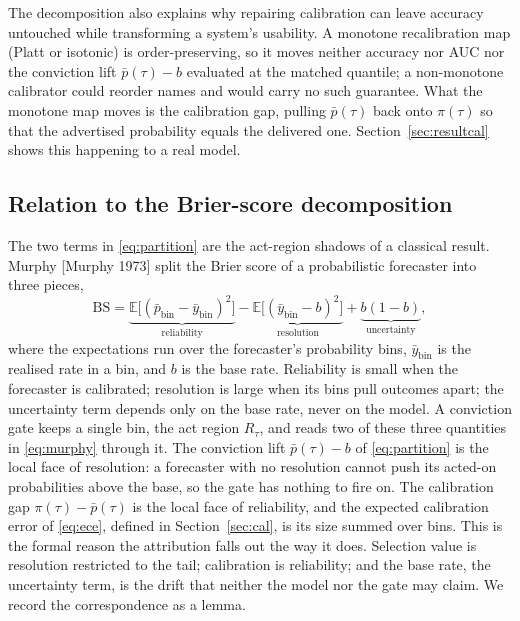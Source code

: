 \documentclass[10pt, a4paper, oneside]{article}
\theoremstyle{definition}
\theoremstyle{plain}
\begin{document}
The decomposition also explains why repairing calibration can leave accuracy
untouched while transforming a system's usability. A monotone recalibration map (Platt
or isotonic) is order-preserving, so it moves neither accuracy nor AUC nor the
conviction lift $\bar p(\tau)-b$ evaluated at the matched quantile; a non-monotone
calibrator could reorder names and would carry no such guarantee. What the monotone
map moves is the calibration gap, pulling $\bar p(\tau)$ back onto $\pi(\tau)$ so that
the advertised probability equals the delivered one. Section~\ref{sec:resultcal} shows
this happening to a real model.

\subsection{Relation to the Brier-score decomposition}
\label{sec:brier}
The two terms in \eqref{eq:partition} are the act-region shadows of a classical
result. Murphy [Murphy 1973] split the Brier score of a probabilistic forecaster into
three pieces,
\begin{equation}
\label{eq:murphy}
\mathrm{BS}=\underbrace{\mathbb{E}\big[(\bar p_{\text{bin}}-\bar y_{\text{bin}})^2\big]}_{\text{reliability}}
-\underbrace{\mathbb{E}\big[(\bar y_{\text{bin}}-b)^2\big]}_{\text{resolution}}
+\underbrace{b(1-b)}_{\text{uncertainty}},
\end{equation}
where the expectations run over the forecaster's probability bins, $\bar y_{\text{bin}}$
is the realised rate in a bin, and $b$ is the base rate. Reliability is small when the
forecaster is calibrated; resolution is large when its bins pull outcomes apart; the
uncertainty term depends only on the base rate, never on the model. A conviction gate
keeps a single bin, the act region $R_\tau$, and reads two of these three quantities
in \eqref{eq:murphy} through it. The conviction lift $\bar p(\tau)-b$ of \eqref{eq:partition} is the local
face of resolution: a forecaster with no resolution cannot push its acted-on
probabilities above the base, so the gate has nothing to fire on. The calibration gap
$\pi(\tau)-\bar p(\tau)$ is the local face of reliability, and the expected calibration
error of \eqref{eq:ece}, defined in Section~\ref{sec:cal}, is its size summed over
bins. This is the formal reason the
attribution falls out the way it does. Selection value is resolution restricted to the
tail; calibration is reliability; and the base rate, the uncertainty term, is the drift
that neither the model nor the gate may claim. We record the correspondence as a lemma.
\end{document}
